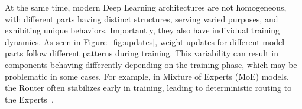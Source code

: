 \documentclass{article}
\theoremstyle{plain}
\theoremstyle{definition}
\theoremstyle{remark}
\newcommand{\sj}[1]{\textcolor{blue}{[SJ: #1]}}
\newcommand{\jl}[1]{\textcolor{green}{[JL: #1]}}
\begin{document}
    
    At the same time, modern Deep Learning architectures are not homogeneous, with different parts having distinct structures, serving varied purposes, and exhibiting unique behaviors. Importantly, they also have individual training dynamics. As seen in Figure~\ref{fig:updates}, weight updates for different model parts follow different patterns during training. This variability can result in components behaving differently depending on the training phase, which may be problematic in some cases. For example, in Mixture of Experts (MoE) models, the Router often stabilizes early in training, leading to deterministic routing to the Experts~\citep{xue2024openmoe}. %
    
    
    
    
\end{document}
